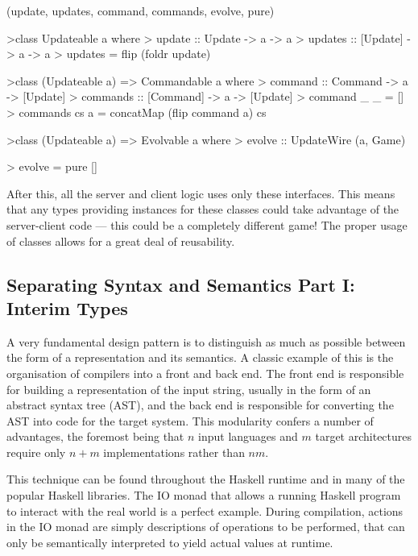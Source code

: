 \functions(update, updates, command, commands, evolve, pure)
\begin{haskell}

>class Updateable a where
>  update  ::  Update  -> a -> a
>  updates :: [Update] -> a -> a
>  updates = flip (foldr update)

>class (Updateable a) => Commandable a where
>  command  ::  Command  -> a -> [Update] 
>  commands :: [Command] -> a -> [Update]
>  command _ _ = []
>  commands cs a = concatMap (flip command a) cs

>class (Updateable a) => Evolvable a where
>  evolve :: UpdateWire (a, Game)

\vspace{-1.7em}
>  evolve = pure []

\end{haskell}
\noindent After this, all the server and client logic uses only these interfaces. This means that any types providing instances for these classes could take advantage of the server-client code --- this could be a completely different game! The proper usage of classes allows for a great deal of reusability. 

\subsection{Separating Syntax and Semantics Part I: Interim Types}

A very fundamental design pattern is to distinguish as much as possible between the form of a representation and its semantics. A classic example of this is the organisation of compilers into a front and back end. The front end is responsible for building a representation of the input string, usually in the form of an abstract syntax tree (AST), and the back end is responsible for converting the AST into code for the target system. This modularity confers a number of advantages, the foremost being that $n$ input languages and $m$ target architectures require only $n+m$ implementations rather than $nm$.

This technique can be found throughout the Haskell runtime and in many of the popular Haskell libraries. The IO monad that allows a running Haskell program to interact with the real world is a perfect example. During compilation, actions in the IO monad are simply descriptions of operations to be performed, that can only be semantically interpreted to yield actual values at runtime.\cite{peyton1993imperative}

